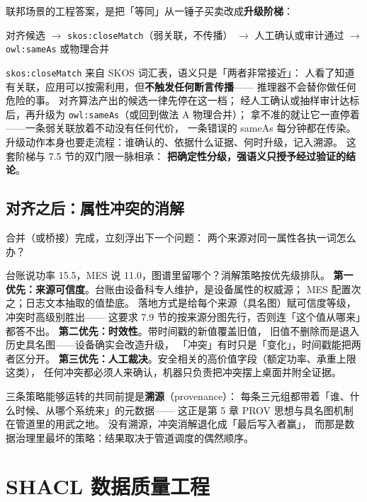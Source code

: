 联邦场景的工程答案，是把「等同」从一锤子买卖改成\textbf{升级阶梯}：

\begin{center}
对齐候选 \(\rightarrow\) \texttt{skos:closeMatch}（弱关联，不传播）
\(\rightarrow\) 人工确认或审计通过 \(\rightarrow\) \texttt{owl:sameAs} 或物理合并
\end{center}

\texttt{skos:closeMatch} 来自 SKOS 词汇表，语义只是「两者非常接近」：
人看了知道有关联，应用可以按需利用，但\textbf{不触发任何断言传播}——
推理器不会替你做任何危险的事。
对齐算法产出的候选一律先停在这一档；
经人工确认或抽样审计达标后，再升级为 \texttt{owl:sameAs}（或回到做法 A 物理合并）；
拿不准的就让它一直停着——一条弱关联放着不动没有任何代价，
一条错误的 sameAs 每分钟都在传染。
升级动作本身也要走流程：谁确认的、依据什么证据、何时升级，记入溯源。
这套阶梯与 7.5 节的双门限一脉相承：
\textbf{把确定性分级，强语义只授予经过验证的结论}。

\subsection{对齐之后：属性冲突的消解}

合并（或桥接）完成，立刻浮出下一个问题：
两个来源对同一属性各执一词怎么办？



台账说功率 15.5，MES 说 11.0，图谱里留哪个？消解策略按优先级排队。
\textbf{第一优先：来源可信度}。台账由设备科专人维护，是设备属性的权威源；
MES 配置次之；日志文本抽取的值垫底。
落地方式是给每个来源（具名图）赋可信度等级，冲突时高级别胜出——
这要求 7.9 节的按来源分图先行，否则连「这个值从哪来」都答不出。
\textbf{第二优先：时效性}。带时间戳的新值覆盖旧值，
旧值不删除而是退入历史具名图——设备确实会改造升级，
「冲突」有时只是「变化」，时间戳能把两者区分开。
\textbf{第三优先：人工裁决}。安全相关的高价值字段（额定功率、承重上限这类），
任何冲突都必须人来确认，机器只负责把冲突摆上桌面并附全证据。

三条策略能够运转的共同前提是\textbf{溯源}（provenance）：
每条三元组都带着「谁、什么时候、从哪个系统来」的元数据——
这正是第 5 章 PROV 思想与具名图机制在管道里的用武之地。
没有溯源，冲突消解退化成「最后写入者赢」，
而那是数据治理里最坏的策略：结果取决于管道调度的偶然顺序。

\section{SHACL 数据质量工程}

